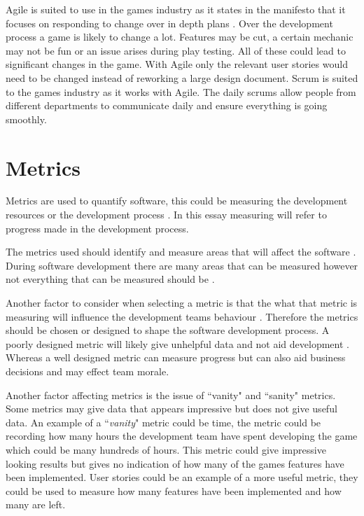 \documentclass{scrartcl}
\begin{document}
Agile is suited to use in the games industry as it states in the manifesto that it focuses on responding to change over in depth plans \cite{AgileManifesto}.  Over the development process a game is likely to change a lot. Features may be cut, a certain mechanic may not be fun or an issue arises during play testing. All of these could lead to significant changes in the game. With Agile only the relevant user stories would need to be changed instead of reworking a large design document. Scrum is suited to the games industry as it works with Agile. The daily scrums allow people from different departments to communicate daily and ensure everything is going smoothly.

\section{Metrics}

Metrics are used to quantify software, this could be measuring the development resources or the development process \cite{Misra}. In this essay measuring will refer to progress made in the development process. 

The metrics used should identify and measure areas that will affect the software \cite{Misra}. During software development there are many areas that can be measured however not everything that can be measured should be \cite{Hartmann}.

Another factor to consider when selecting a metric is that the what that metric is measuring will influence the development teams behaviour \cite{Hartmann}. Therefore the metrics should be chosen or  designed to shape the software development process. A poorly designed metric will likely give unhelpful data and not aid development \cite{Ktata}. Whereas a well designed metric can measure progress but can also aid business decisions and may effect team morale. \cite{Misra}

Another factor affecting metrics is the issue of ``vanity" and ``sanity" metrics. Some metrics may give data that appears impressive but does not give useful data. An example of a ``\textit{vanity}" metric could be time, the metric could be recording how many hours the development team have spent developing the game which could be many hundreds of hours. This metric could give impressive looking results but gives no indication of how many of the games features have been implemented. User stories could be an example of a more useful metric, they could be used to measure how many features have been implemented and how many are left.
\end{document}
